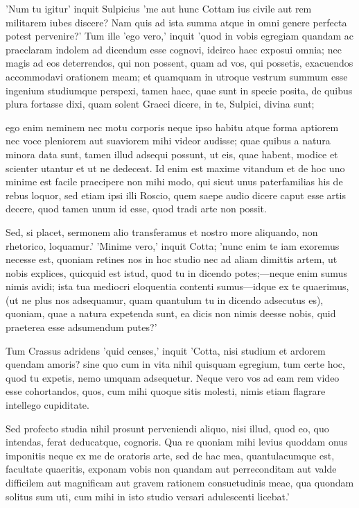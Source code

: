  'Num tu igitur' inquit Sulpicius 'me aut hunc Cottam ius civile aut rem militarem iubes discere? Nam quis ad ista summa atque in omni genere perfecta potest pervenire?' Tum ille 'ego vero,' inquit 'quod in vobis egregiam quandam ac praeclaram indolem ad dicendum esse cognovi, idcirco haec exposui omnia; nec magis ad eos deterrendos, qui non possent, quam ad vos, qui possetis, exacuendos accommodavi orationem meam; et quamquam in utroque vestrum summum esse ingenium studiumque perspexi, tamen haec, quae sunt in specie posita, de quibus plura fortasse dixi, quam solent Graeci dicere, in te, Sulpici, divina sunt;

 ego enim neminem nec motu corporis neque ipso habitu atque forma aptiorem nec voce pleniorem aut suaviorem mihi videor audisse; quae quibus a natura minora data sunt, tamen illud adsequi possunt, ut eis, quae habent, modice et scienter utantur et ut ne dedeceat. Id enim est maxime vitandum et de hoc uno minime est facile praecipere non mihi modo, qui sicut unus paterfamilias his de rebus loquor, sed etiam ipsi illi Roscio, quem saepe audio dicere caput esse artis decere, quod tamen unum id esse, quod tradi arte non possit.

 Sed, si placet, sermonem alio transferamus et nostro more aliquando, non rhetorico, loquamur.' 'Minime vero,' inquit Cotta; 'nunc enim te iam exoremus necesse est, quoniam retines nos in hoc studio nec ad aliam dimittis artem, ut nobis explices, quicquid est istud, quod tu in dicendo potes;—neque enim sumus nimis avidi; ista tua mediocri eloquentia contenti sumus—idque ex te quaerimus, (ut ne plus nos adsequamur, quam quantulum tu in dicendo adsecutus es), quoniam, quae a natura expetenda sunt, ea dicis non nimis deesse nobis, quid praeterea esse adsumendum putes?'

 Tum Crassus adridens 'quid censes,' inquit 'Cotta, nisi studium et ardorem quendam amoris? sine quo cum in vita nihil quisquam egregium, tum certe hoc, quod tu expetis, nemo umquam adsequetur. Neque vero vos ad eam rem video esse cohortandos, quos, cum mihi quoque sitis molesti, nimis etiam flagrare intellego cupiditate.

 Sed profecto studia nihil prosunt perveniendi aliquo, nisi illud, quod eo, quo intendas, ferat deducatque, cognoris. Qua re quoniam mihi levius quoddam onus imponitis neque ex me de oratoris arte, sed de hac mea, quantulacumque est, facultate quaeritis, exponam vobis non quandam aut perreconditam aut valde difficilem aut magnificam aut gravem rationem consuetudinis meae, qua quondam solitus sum uti, cum mihi in isto studio versari adulescenti licebat.'

